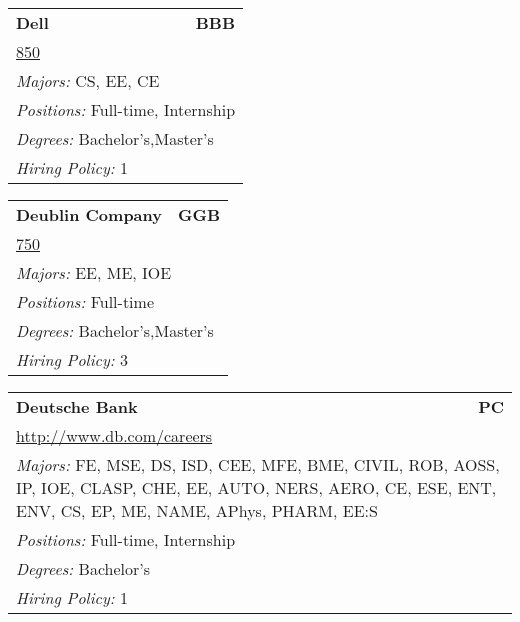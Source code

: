 \documentclass[twoside]{article}
\begin{document}
\begin{center}
\begin{multicols}{3}
\begin{FlushLeft}
\begin{minipage}{.9\columnwidth}
\end{minipage}
 
\begin{minipage}{.9\columnwidth}\begin{tabularx}{.95\columnwidth}{Xr}
                 {\Large\bf Dell} & {\Large\bf BBB}\\
    \multicolumn{2}{p{.95\columnwidth}}{\url{850}}\\
    \multicolumn{2}{p{.95\columnwidth}}{\emph{Majors:} CS, EE, CE}\\
    \multicolumn{2}{p{.95\columnwidth}}{\emph{Positions:} Full-time, Internship}\\
    \multicolumn{2}{p{.95\columnwidth}}{\emph{Degrees:} Bachelor's,Master's}\\
    \multicolumn{2}{p{.95\columnwidth}}{\emph{Hiring Policy:} 1}\\
    \end{tabularx}
    
\end{minipage}
 
\begin{minipage}{.9\columnwidth}\begin{tabularx}{.95\columnwidth}{Xr}
                 {\Large\bf Deublin Company} & {\Large\bf GGB}\\
    \multicolumn{2}{p{.95\columnwidth}}{\url{750}}\\
    \multicolumn{2}{p{.95\columnwidth}}{\emph{Majors:} EE, ME, IOE}\\
    \multicolumn{2}{p{.95\columnwidth}}{\emph{Positions:} Full-time}\\
    \multicolumn{2}{p{.95\columnwidth}}{\emph{Degrees:} Bachelor's,Master's}\\
    \multicolumn{2}{p{.95\columnwidth}}{\emph{Hiring Policy:} 3}\\
    \end{tabularx}
    
\end{minipage}
 
\begin{minipage}{.9\columnwidth}\begin{tabularx}{.95\columnwidth}{Xr}
                 {\Large\bf Deutsche Bank} & {\Large\bf PC}\\
    \multicolumn{2}{p{.95\columnwidth}}{\url{http://www.db.com/careers}}\\
    \multicolumn{2}{p{.95\columnwidth}}{\emph{Majors:} FE, MSE, DS, ISD, CEE, MFE, BME, CIVIL, ROB, AOSS, IP, IOE, CLASP, CHE, EE, AUTO, NERS, AERO, CE, ESE, ENT, ENV, CS, EP, ME, NAME, APhys, PHARM, EE:S}\\
    \multicolumn{2}{p{.95\columnwidth}}{\emph{Positions:} Full-time, Internship}\\
    \multicolumn{2}{p{.95\columnwidth}}{\emph{Degrees:} Bachelor's}\\
    \multicolumn{2}{p{.95\columnwidth}}{\emph{Hiring Policy:} 1}\\
    \end{tabularx}
    

\end{minipage}
\end{FlushLeft}
\end{multicols}
\end{center}
\end{document}
